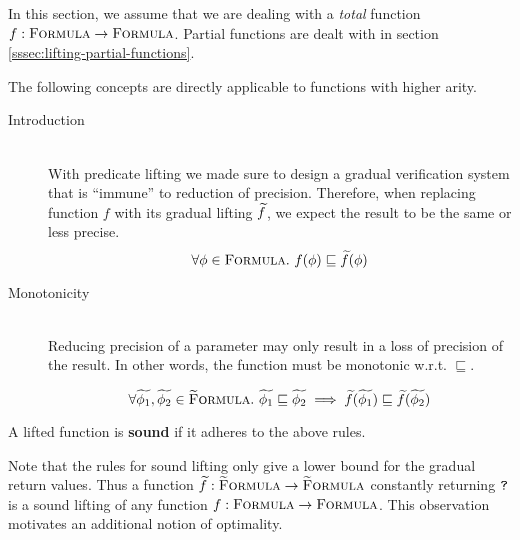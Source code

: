 
In this section, we assume that we are dealing with a \emph{total} function $f : \textup{\textsc{Formula}} \rightarrow \textup{\textsc{Formula}}$.
Partial functions are dealt with in section \ref{sssec:lifting-partial-functions}.

The following concepts are directly applicable to functions with higher arity.

\begin{description}
    \item[Introduction]~\\
    With predicate lifting we made sure to design a gradual verification system that is “immune” to reduction of precision.
    Therefore, when replacing function $f$ with its gradual lifting $\widetilde{f}$, we expect the result to be the same or less precise.
    \begin{displaymath}
    \forall \phi \in \textup{\textsc{Formula}}.~ f(\phi) \sqsubseteq \widetilde{f}(\phi)
    \end{displaymath}
    
    \item[Monotonicity]~\\
    Reducing precision of a parameter may only result in a loss of precision of the result.
    In other words, the function must be monotonic w.r.t. $\sqsubseteq$.
    
    \begin{displaymath}
    \forall \widetilde{\phi_1}, \widetilde{\phi_2} \in \textup{\textsc{\ensuremath{\widetilde{\text{F}}}ormula}}.~ 
    \widetilde{\phi_1} \sqsubseteq \widetilde{\phi_2} 
    \implies 
    \widetilde{f}(\widetilde{\phi_1}) \sqsubseteq \widetilde{f}(\widetilde{\phi_2})
    \end{displaymath}
\end{description}

\begin{definition}
    A lifted function is \textbf{sound} if it adheres to the above rules.
\end{definition}

Note that the rules for sound lifting only give a lower bound for the gradual return values.
Thus a function $\widetilde{f} : \textup{\textsc{\ensuremath{\widetilde{\text{F}}}ormula}} \rightarrow \textup{\textsc{\ensuremath{\widetilde{\text{F}}}ormula}}$ constantly returning $\textup{\texttt{?}}$ is a sound lifting of any function $f : \textup{\textsc{Formula}} \rightarrow \textup{\textsc{Formula}}$.
This observation motivates an additional notion of optimality.

